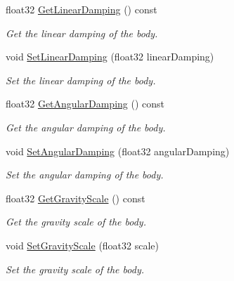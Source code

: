 \begin{DoxyCompactItemize}
float32 \mbox{\hyperlink{classb2Body_aff6bc518ea0f07fa5bba7cb7782e86d1}{Get\+Linear\+Damping}} () const
\begin{DoxyCompactList}\small\item\em Get the linear damping of the body. \end{DoxyCompactList}\item 
\mbox{\label{classb2Body_a909f9753ad700f70282a56e00bc182a5}} 
void \mbox{\hyperlink{classb2Body_a909f9753ad700f70282a56e00bc182a5}{Set\+Linear\+Damping}} (float32 linear\+Damping)
\begin{DoxyCompactList}\small\item\em Set the linear damping of the body. \end{DoxyCompactList}\item 
\mbox{\label{classb2Body_a151f5e81e44037883f61b67821704999}} 
float32 \mbox{\hyperlink{classb2Body_a151f5e81e44037883f61b67821704999}{Get\+Angular\+Damping}} () const
\begin{DoxyCompactList}\small\item\em Get the angular damping of the body. \end{DoxyCompactList}\item 
\mbox{\label{classb2Body_a73a79541b18394fa224d2eae8ad493e8}} 
void \mbox{\hyperlink{classb2Body_a73a79541b18394fa224d2eae8ad493e8}{Set\+Angular\+Damping}} (float32 angular\+Damping)
\begin{DoxyCompactList}\small\item\em Set the angular damping of the body. \end{DoxyCompactList}\item 
\mbox{\label{classb2Body_aa570b2310248b4b3bd776836e839bc45}} 
float32 \mbox{\hyperlink{classb2Body_aa570b2310248b4b3bd776836e839bc45}{Get\+Gravity\+Scale}} () const
\begin{DoxyCompactList}\small\item\em Get the gravity scale of the body. \end{DoxyCompactList}\item 
\mbox{\label{classb2Body_a8e66a570c2aeee93b29d84cae861a612}} 
void \mbox{\hyperlink{classb2Body_a8e66a570c2aeee93b29d84cae861a612}{Set\+Gravity\+Scale}} (float32 scale)
\begin{DoxyCompactList}\small\item\em Set the gravity scale of the body. \end{DoxyCompactList}\item 

\end{DoxyCompactItemize}
